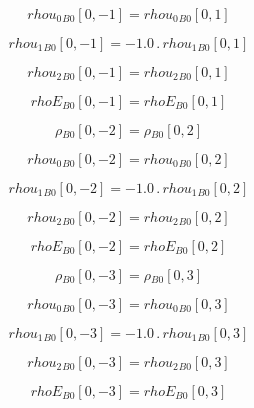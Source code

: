 \documentclass{article}
\begin{document}
\begin{dmath}{rhou_{0}{_{B0}}}[{0,-1}] = {rhou_{0}{_{B0}}}[{0,1}]\end{dmath}

\begin{dmath}{rhou_{1}{_{B0}}}[{0,-1}] = - 1.0 \,.\, {rhou_{1}{_{B0}}}[{0,1}]\end{dmath}

\begin{dmath}{rhou_{2}{_{B0}}}[{0,-1}] = {rhou_{2}{_{B0}}}[{0,1}]\end{dmath}

\begin{dmath}{rhoE{_{B0}}}[{0,-1}] = {rhoE{_{B0}}}[{0,1}]\end{dmath}

\begin{dmath}{\rho{_{B0}}}[{0,-2}] = {\rho{_{B0}}}[{0,2}]\end{dmath}

\begin{dmath}{rhou_{0}{_{B0}}}[{0,-2}] = {rhou_{0}{_{B0}}}[{0,2}]\end{dmath}

\begin{dmath}{rhou_{1}{_{B0}}}[{0,-2}] = - 1.0 \,.\, {rhou_{1}{_{B0}}}[{0,2}]\end{dmath}

\begin{dmath}{rhou_{2}{_{B0}}}[{0,-2}] = {rhou_{2}{_{B0}}}[{0,2}]\end{dmath}

\begin{dmath}{rhoE{_{B0}}}[{0,-2}] = {rhoE{_{B0}}}[{0,2}]\end{dmath}

\begin{dmath}{\rho{_{B0}}}[{0,-3}] = {\rho{_{B0}}}[{0,3}]\end{dmath}

\begin{dmath}{rhou_{0}{_{B0}}}[{0,-3}] = {rhou_{0}{_{B0}}}[{0,3}]\end{dmath}

\begin{dmath}{rhou_{1}{_{B0}}}[{0,-3}] = - 1.0 \,.\, {rhou_{1}{_{B0}}}[{0,3}]\end{dmath}

\begin{dmath}{rhou_{2}{_{B0}}}[{0,-3}] = {rhou_{2}{_{B0}}}[{0,3}]\end{dmath}

\begin{dmath}{rhoE{_{B0}}}[{0,-3}] = {rhoE{_{B0}}}[{0,3}]\end{dmath}
\end{document}
